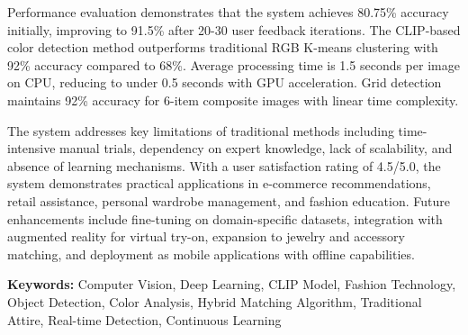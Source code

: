 \documentclass[12pt,a4paper]{report}
\begin{document}
\vspace{0.5cm}

Performance evaluation demonstrates that the system achieves 80.75\% accuracy initially, improving to 91.5\% after 20-30 user feedback iterations. The CLIP-based color detection method outperforms traditional RGB K-means clustering with 92\% accuracy compared to 68\%. Average processing time is 1.5 seconds per image on CPU, reducing to under 0.5 seconds with GPU acceleration. Grid detection maintains 92\% accuracy for 6-item composite images with linear time complexity.

\vspace{0.5cm}

The system addresses key limitations of traditional methods including time-intensive manual trials, dependency on expert knowledge, lack of scalability, and absence of learning mechanisms. With a user satisfaction rating of 4.5/5.0, the system demonstrates practical applications in e-commerce recommendations, retail assistance, personal wardrobe management, and fashion education. Future enhancements include fine-tuning on domain-specific datasets, integration with augmented reality for virtual try-on, expansion to jewelry and accessory matching, and deployment as mobile applications with offline capabilities.

\vspace{0.5cm}

\textbf{Keywords:} Computer Vision, Deep Learning, CLIP Model, Fashion Technology, Object Detection, Color Analysis, Hybrid Matching Algorithm, Traditional Attire, Real-time Detection, Continuous Learning
\end{document}
